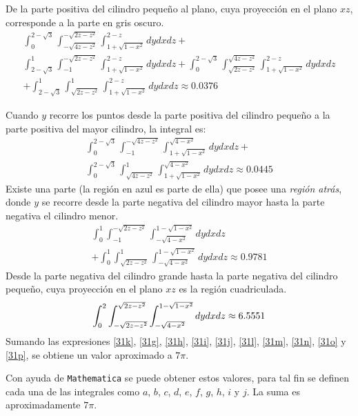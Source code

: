 De la parte positiva del cilindro pequeño al plano, cuya proyección en el plano $xz$, corresponde a la parte en gris oscuro.
\begin{multline}
\int_{0}^{2-\sqrt{3}}\int_{-\sqrt{4z-z^2}}^{-\sqrt{2z-z^2}}\int_{1+\sqrt{1-x^2}}^{2-z}dydxdz + \\ \int_{2-\sqrt{3}}^{1}\int_{-1}^{-\sqrt{2z-z^2}}\int_{1+\sqrt{1-x^2}}^{2-z}dydxdz+ \int_{0}^{2-\sqrt{3}}\int_{\sqrt{2z-z^2}}^{\sqrt{4z-z^2}}\int_{1+\sqrt{1-x^2}}^{2-z}dydxdz \\
+\int_{2-\sqrt{3}}^{1}\int_{\sqrt{2z-z^2}}^{1}\int_{1+\sqrt{1-x^2}}^{2-z}dydxdz \approx 0.0376 \label{31m}
\end{multline}

\clearpage

Cuando $y$ recorre los puntos desde la parte positiva del cilindro pequeño a la parte positiva del mayor cilindro, la integral es:
\begin{multline}
\int_{0}^{2-\sqrt{3}}\int_{-1}^{-\sqrt{4z-z^2}}\int_{1+\sqrt{1-x^2}}^{\sqrt{4-x^2}}dydxdz+ \\
\int_{0}^{2-\sqrt{3}}\int_{\sqrt{4z-z^2}}^{1}\int_{1+\sqrt{1-x^2}}^{\sqrt{4-x^2}}dydxdz \approx 0.0445 \label{31n}
\end{multline}
Existe una parte (la región en azul es parte de ella) que posee una \emph{región atrás}, donde $y$ se recorre desde la parte negativa del cilindro mayor hasta la parte negativa el cilindro menor.
\begin{multline}
\int_{0}^{1}\int_{-1}^{-\sqrt{2z-z^2}}\int_{-\sqrt{4-x^2}}^{1-\sqrt{1-x^2}}dydxdz \\
+\int_{0}^{1}\int_{\sqrt{2z-z^2}}^{1}\int_{-\sqrt{4-x^2}}^{1-\sqrt{1-x^2}}dydxdz \approx 0.9781 \label{31o}
\end{multline}
Desde la parte negativa del cilindro grande hasta la parte negativa del cilindro pequeño, cuya proyección en el plano $xz$ es la región cuadriculada.
\begin{equation} \label{31p}
\int_{0}^2\int_{-\sqrt{2z-z^2}}^{\sqrt{2z-z^2}}\int_{-\sqrt{%
4-x^2}}^{1-\sqrt{1-x^2}}dydxdz \approx 6. 5551
\end{equation}
Sumando las expresiones \ref{31k}, \ref{31g}, \ref{31h}, \ref{31i}, \ref{31j}, \ref{31l}, \ref{31m}, \ref{31n},
\ref{31o} y \ref{31p}, se obtiene un valor aproximado a $7\pi$.

Con ayuda de \verb"Mathematica" se puede obtener estos valores, para tal fin se definen cada una de las integrales como $a$, $b$, $c$, $d$, $e$, $f$, $g$, $h$, $i$ y $j$.
La suma es aproximadamente $7\pi$.

